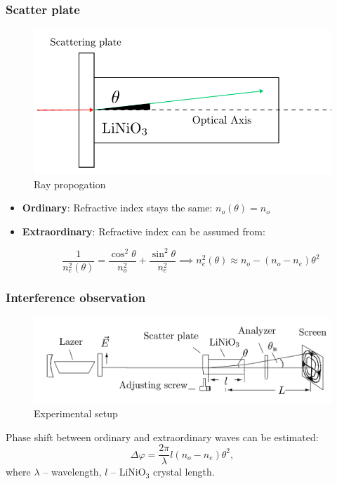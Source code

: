\documentclass{beamer}
\begin{document}
		
	\begin{frame}
		\frametitle{Scatter plate}		
		\begin{figure}
			\footnotesize
			\centering
			\includegraphics[width=0.9\linewidth]{res/theta_propagation}
			\vspace{-5pt}
			\footnotesize
			\caption{\footnotesize Ray propogation}
		\end{figure}
		
		\footnotesize
		\begin{itemize}
			\item[] \textbf{Ordinary}: Refractive index stays the same: $n_o(\theta) = n_o$
			
			\item[] \textbf{Extraordinary}: Refractive index can be assumed from:
			
			$$\frac{1}{n_e^2(\theta)} = \frac{\cos^2{\theta}}{n_o^2} + \frac{\sin^2{\theta}}{n_e^2} \implies n_e^2(\theta) \approx n_o - (n_o - n_e) \theta^2$$
		\end{itemize}	
	\end{frame}
	
	\begin{frame}
		\frametitle{Interference observation}
		
		\begin{figure}
			\centering
			\includegraphics[width=1\linewidth]{res/scheme}
			\caption{Experimental setup}
		\end{figure}
		
		Phase shift between ordinary and extraordinary waves can be estimated:
		$$
		\Delta \varphi = \frac{2\pi}{\lambda}l(n_o - n_e)\theta^2,
		$$
		where $\lambda$ -- wavelength, $l$ -- LiNiO$_3$ crystal length.
	\end{frame}
\end{document}
